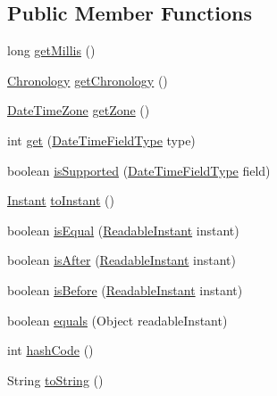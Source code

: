 \subsection*{Public Member Functions}
\begin{DoxyCompactItemize}
\item 
long \hyperlink{interfaceorg_1_1joda_1_1time_1_1_readable_instant_aa69c5d8aed4dab4209169446c1629f06}{get\-Millis} ()
\item 
\hyperlink{classorg_1_1joda_1_1time_1_1_chronology}{Chronology} \hyperlink{interfaceorg_1_1joda_1_1time_1_1_readable_instant_a7c2a00b583a68416e7d1deb58112296e}{get\-Chronology} ()
\item 
\hyperlink{classorg_1_1joda_1_1time_1_1_date_time_zone}{Date\-Time\-Zone} \hyperlink{interfaceorg_1_1joda_1_1time_1_1_readable_instant_ad6cf47b5cc64e1b8effe00cd24a32b11}{get\-Zone} ()
\item 
int \hyperlink{interfaceorg_1_1joda_1_1time_1_1_readable_instant_a076030918ca5525e5f8d2125c3c83459}{get} (\hyperlink{classorg_1_1joda_1_1time_1_1_date_time_field_type}{Date\-Time\-Field\-Type} type)
\item 
boolean \hyperlink{interfaceorg_1_1joda_1_1time_1_1_readable_instant_a28ffef1035f4176edf7d1b0c72cf0a63}{is\-Supported} (\hyperlink{classorg_1_1joda_1_1time_1_1_date_time_field_type}{Date\-Time\-Field\-Type} field)
\item 
\hyperlink{classorg_1_1joda_1_1time_1_1_instant}{Instant} \hyperlink{interfaceorg_1_1joda_1_1time_1_1_readable_instant_acee12fc8f5e991ed56680a6b01bb1624}{to\-Instant} ()
\item 
boolean \hyperlink{interfaceorg_1_1joda_1_1time_1_1_readable_instant_aab6c281089bd83d9c240b638dbdf7a49}{is\-Equal} (\hyperlink{interfaceorg_1_1joda_1_1time_1_1_readable_instant}{Readable\-Instant} instant)
\item 
boolean \hyperlink{interfaceorg_1_1joda_1_1time_1_1_readable_instant_a5e7db384b53eedc37c6a83dd944c359a}{is\-After} (\hyperlink{interfaceorg_1_1joda_1_1time_1_1_readable_instant}{Readable\-Instant} instant)
\item 
boolean \hyperlink{interfaceorg_1_1joda_1_1time_1_1_readable_instant_a84a5df29e953135cff5d1ae7d0546c4f}{is\-Before} (\hyperlink{interfaceorg_1_1joda_1_1time_1_1_readable_instant}{Readable\-Instant} instant)
\item 
boolean \hyperlink{interfaceorg_1_1joda_1_1time_1_1_readable_instant_af2e65da86a093ae06fd24dde48d99d21}{equals} (Object readable\-Instant)
\item 
int \hyperlink{interfaceorg_1_1joda_1_1time_1_1_readable_instant_a3083f60a321d2622b18d493845b39091}{hash\-Code} ()
\item 
String \hyperlink{interfaceorg_1_1joda_1_1time_1_1_readable_instant_aab63d161a1e6b3037aea0811a1cc7499}{to\-String} ()
\end{DoxyCompactItemize}


